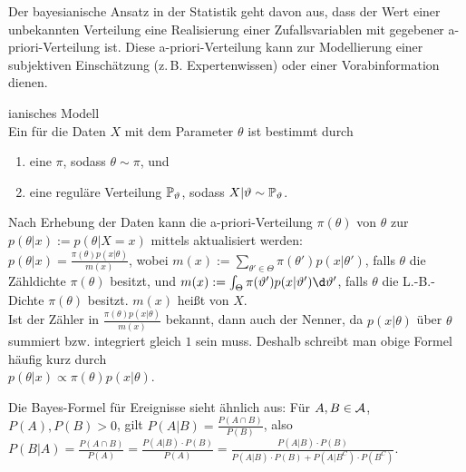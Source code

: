 \begin{Bem}
    Der bayesianische Ansatz in der Statistik geht davon aus, dass der Wert einer unbekannten
    Verteilung eine Realisierung einer Zufallsvariablen mit gegebener
    a-priori-Verteilung ist.
    Diese a-priori-Verteilung kann zur Modellierung einer subjektiven Einschätzung
    (z.\,B. Expertenwissen) oder einer Vorabinformation dienen.
\end{Bem}

\begin{Def}{ianisches Modell}\\
    Ein  für die Daten $X$ mit dem Parameter $\theta$
    ist bestimmt durch
    \begin{enumerate}
        \item
        eine  $\pi$, sodass $\theta \sim \pi$, und

        \item
        eine reguläre Verteilung $\mathbb{P}_\vartheta$, sodass $X|\vartheta \sim \mathbb{P}_\vartheta$.
    \end{enumerate}
\end{Def}

\linie

\begin{Bem}
    Nach Erhebung der Daten kann die a-priori-Verteilung $\pi(\theta)$ von $\theta$
    zur  $p(\theta|x) := p(\theta|X=x)$ mittels
     aktualisiert werden:\\
    $p(\theta|x) = \frac{\pi(\theta) p(x|\theta)}{m(x)}$,
    wobei $m(x) := \sum_{\theta' \in \Theta} \pi(\theta') p(x|\theta')$, falls $\theta$ die
    Zähldichte $\pi(\theta)$ besitzt, und
    $m(x) := \int_\Theta \pi(\theta') p(x|\theta') \d\theta'$, falls $\theta$ die L.-B.-Dichte
    $\pi(\theta)$ besitzt.
    $m(x)$ heißt  von $X$.\\
    Ist der Zähler in $\frac{\pi(\theta) p(x|\theta)}{m(x)}$ bekannt, dann auch der Nenner,
    da $p(x|\theta)$ über $\theta$ summiert bzw. integriert gleich $1$ sein muss.
    Deshalb schreibt man obige Formel häufig kurz durch\\
    $p(\theta|x) \propto \pi(\theta) p(x|\theta)$.
\end{Bem}

\begin{Bem}
    Die Bayes-Formel für Ereignisse sieht ähnlich aus:
    Für $A, B \in \mathcal{A}$, $P(A), P(B) > 0$, gilt
    $P(A|B) = \frac{P(A \cap B)}{P(B)}$, also
    $P(B|A) = \frac{P(A \cap B)}{P(A)} = \frac{P(A|B) \cdot P(B)}{P(A)} =
    \frac{P(A|B) \cdot P(B)}{P(A|B) \cdot P(B) + P(A|B^C) \cdot P(B^C)}$.
\end{Bem}


